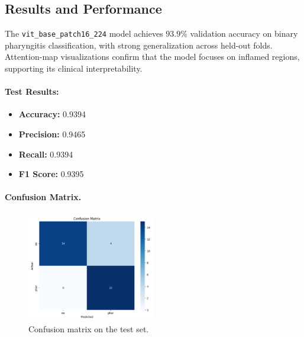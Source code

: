 \subsection{Results and Performance}
The \texttt{vit\_base\_patch16\_224} model achieves \(\mathbf{93.9\%}\) validation accuracy on binary pharyngitis classification, with strong generalization across held-out folds. Attention-map visualizations confirm that the model focuses on inflamed regions, supporting its clinical interpretability.

\paragraph{Test Results:}
\begin{itemize}
  \item \textbf{Accuracy:} 0.9394  
  \item \textbf{Precision:} 0.9465  
  \item \textbf{Recall:} 0.9394 
  \item \textbf{F1 Score:} 0.9395 
\end{itemize}

\paragraph{Confusion Matrix.}
\begin{figure}[h]
  \centering
  \includegraphics[width=0.5\textwidth]{images/phar_confusion_matrix.png}
  \caption{Confusion matrix on the test set.}
  \label{fig:phar_confusion_matrix}
\end{figure}

